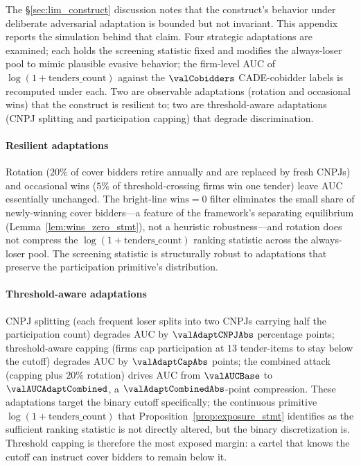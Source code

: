 The §\ref{sec:lim_construct} discussion notes that the
construct's behavior under deliberate adversarial adaptation is
bounded but not invariant. This appendix reports the simulation
behind that claim. Four strategic adaptations are examined; each
holds the screening statistic fixed and modifies the always-loser
pool to mimic plausible evasive behavior; the firm-level AUC of
$\log(1+\text{tenders\_count})$ against the $\valCobidders$
CADE-cobidder labels is recomputed under each. Two are observable
adaptations (rotation and occasional wins) that the construct is
resilient to; two are threshold-aware adaptations (CNPJ splitting
and participation capping) that degrade discrimination.



\paragraph{Resilient adaptations}
Rotation ($20\%$ of cover bidders retire annually and are
replaced by fresh CNPJs) and occasional wins ($5\%$ of
threshold-crossing firms win one tender) leave AUC essentially
unchanged. The bright-line $\text{wins}=0$ filter eliminates
the small share of newly-winning cover bidders---a feature of
the framework's separating equilibrium
(Lemma~\ref{lem:wins_zero_stmt}), not a heuristic
robustness---and rotation does not compress the
$\log(1+\text{tenders\_count})$ ranking statistic across the
always-loser pool. The screening statistic is structurally
robust to adaptations that preserve the participation
primitive's distribution.

\paragraph{Threshold-aware adaptations}
CNPJ splitting (each frequent loser splits into two CNPJs
carrying half the participation count) degrades AUC by
$\valAdaptCNPJAbs$ percentage points; threshold-aware capping
(firms cap participation at $13$ tender-items to stay below the
cutoff) degrades AUC by $\valAdaptCapAbs$ points; the combined
attack (capping plus $20\%$ rotation) drives AUC from
$\valAUCBase$ to $\valAUCAdaptCombined$, a
$\valAdaptCombinedAbs$-point compression. These adaptations
target the binary cutoff specifically; the continuous primitive
$\log(1+\text{tenders\_count})$ that
Proposition~\ref{prop:exposure_stmt} identifies as the
sufficient ranking statistic is not directly altered, but the
binary discretization is. Threshold capping is therefore the
most exposed margin: a cartel that knows the cutoff can
instruct cover bidders to remain below it.

